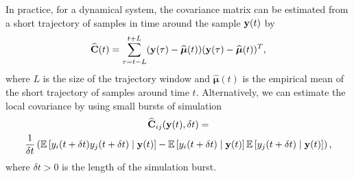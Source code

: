 
In practice, for a dynamical system, the covariance matrix can be estimated from a short trajectory of samples in time around the sample $\mathbf{y}(t)$ by
\begin{equation} \label{eq:cov1}
	\widehat{\mathbf{C}}(t) = \sum \limits _{\tau = t-L}^{t+L} (\mathbf{y}(\tau) - \widehat{\boldsymbol{\mu}}(t))(\mathbf{y}(\tau) - \widehat{\boldsymbol{\mu}}(t))^T,
\end{equation}
where $L$ is the size of the trajectory window and $\widehat{\boldsymbol{\mu}}(t)$ is the empirical mean of the short trajectory of samples around time $t$.
%
Alternatively, we can estimate the local covariance by using small bursts of simulation
\begin{multline} \label{eq:cov2}
\widehat{\mathbf{C}}_{ij}(\mathbf{y}(t), \delta t)
= \\
\frac{1}{ \delta t} \left( \mathbb{E} \left[ y_i (t+\delta t) y_j (t+ \delta t) \mid \mathbf{y}(t) \right]
- \mathbb{E} \left[ y_i (t+\delta t) \mid \mathbf{y}(t) \right] \mathbb{E} \left[ y_j (t+\delta t) \mid \mathbf{y}(t) \right] \right) ,
\end{multline}
%
where $\delta t > 0$ is the length of the simulation burst.
%

